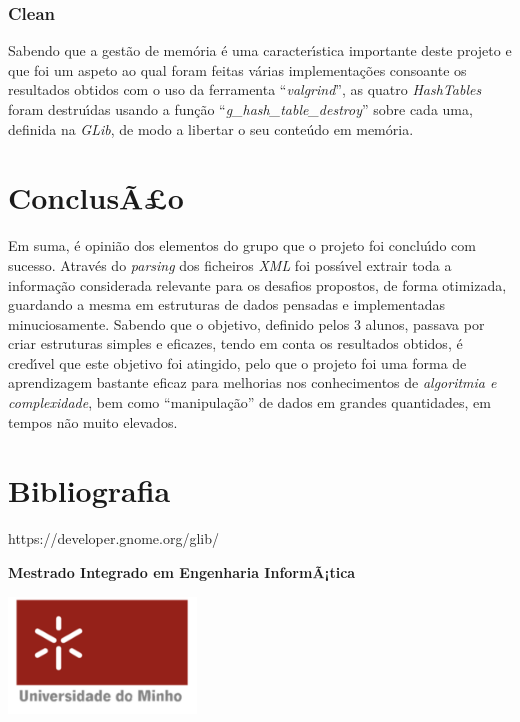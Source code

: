 \documentclass{article}
\begin{document}
\subsubsection{Clean}
\par Sabendo que a gest\~{a}o de mem\'{o}ria \'{e} uma caracter\'{\i}stica importante deste projeto e que foi um aspeto ao qual foram feitas v\'{a}rias implementa\c{c}\~{o}es consoante os resultados obtidos com o uso da ferramenta \textquotedblleft{}\emph{valgrind}\textquotedblright{}, as quatro \emph{HashTables} foram destru\'{\i}das usando a fun\c{c}\~{a}o \textquotedblleft{}\emph{g\_hash\_table\_destroy}\textquotedblright{} sobre cada uma, definida na \emph{GLib}, de modo a libertar o seu conte\'{u}do em mem\'{o}ria. 

\newpage

\section{ConclusÃ£o}
\par Em suma, \'{e} opini\~{a}o dos elementos do grupo que o projeto foi conclu\'{\i}do com sucesso. Atrav\'{e}s do \emph{parsing} dos ficheiros \emph{XML} foi poss\'{\i}vel extrair toda a informa\c{c}\~{a}o considerada relevante para os desafios propostos, de forma otimizada, guardando a mesma em estruturas de dados pensadas e implementadas minuciosamente. Sabendo que o objetivo, definido pelos 3 alunos, passava por criar estruturas simples e eficazes, tendo em conta os resultados obtidos, \'{e} cred\'{\i}vel que este objetivo foi atingido, pelo que o projeto foi uma forma de aprendizagem bastante eficaz para melhorias nos conhecimentos de \emph{algoritmia e complexidade}, bem como \textquotedblleft{}manipula\c{c}\~{a}o\textquotedblright{} de dados em grandes quantidades, em tempos n\~{a}o muito elevados.

\section{Bibliografia}
\par https://developer.gnome.org/glib/

\begin{center}
\vfill
\bf Mestrado Integrado em Engenharia InformÃ¡tica
\par
\includegraphics[width=5cm]{UM}
\end{center}
\end{document}
